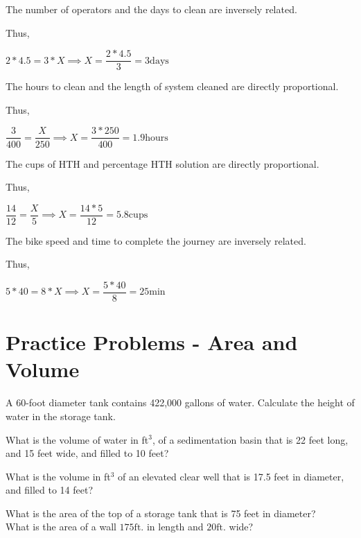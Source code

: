 \vspace{0.5cm}

The number of operators and the days to clean are inversely related.

Thus,

$2 * 4.5 = 3*X \implies X = \dfrac{2*4.5}{3} = 3 \mathrm{days}$



\vspace{0.5cm}

The hours to clean and the length of system cleaned are directly proportional.

Thus,

$\dfrac{3}{400}=\dfrac{X}{250} \implies X=\dfrac{3*250}{400}=1.9 \mathrm{hours}$

\vspace{0.5cm}

The cups of HTH and percentage HTH solution are directly proportional.

Thus,

$\dfrac{14}{12}=\dfrac{X}{5} \implies X=\dfrac{14*5}{12}=5.8 \mathrm{cups}$

\vspace{0.3cm}

The bike speed and time to complete the journey are inversely related.

Thus,

$5 * 40 = 8*X \implies X = \dfrac{5*40}{8} = 25 \mathrm{min}$



\vspace{1cm}
\section*{Practice Problems - Area and Volume}


A 60-foot diameter tank contains 422,000 gallons of water. Calculate the height of water in the storage tank.

What is the volume of water in ft$^3$, of a sedimentation basin that is 22 feet long, and 15 feet wide, and filled to 10 feet?

What is the volume in ft$^3$ of an elevated clear well that is 17.5 feet in diameter, and filled to 14 feet?

What is the area of the top of a storage tank that is 75 feet in diameter?\\

 What is the area of a wall $175 \mathrm{ft}$. in length and $20 \mathrm{ft}$. wide?\\

